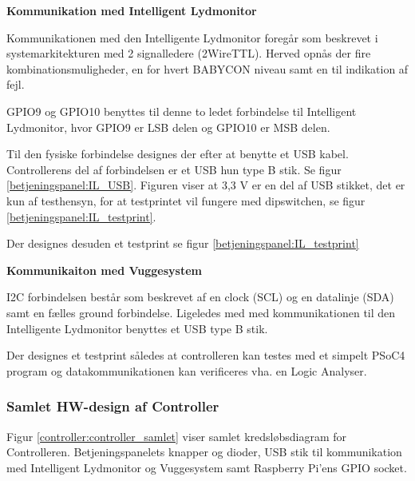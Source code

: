 \textbf{Kommunikation med Intelligent Lydmonitor}

Kommunikationen med den Intelligente Lydmonitor foregår som beskrevet i systemarkitekturen med 2 signalledere (2WireTTL). Herved opnås der fire kombinationsmuligheder, en for hvert BABYCON niveau samt en til indikation  af fejl.

GPIO9 og GPIO10 benyttes til denne to ledet forbindelse til Intelligent Lydmonitor, hvor GPIO9 er LSB delen og GPIO10 er MSB delen. 

Til den fysiske forbindelse designes der efter at benytte et USB kabel. Controllerens del af forbindelsen er et USB hun type B stik. Se figur \ref{betjeningspanel:IL_USB}. Figuren viser at 3,3 V er en del af USB stikket, det er kun af testhensyn, for at testprintet vil fungere med dipswitchen, se figur \ref{betjeningspanel:IL_testprint}.

 
Der designes desuden et testprint se figur  \ref{betjeningspanel:IL_testprint}


\textbf{Kommunikaiton med Vuggesystem}

I2C forbindelsen består som beskrevet af en clock (SCL) og en datalinje (SDA) samt en fælles ground forbindelse. Ligeledes med med kommunikationen til den Intelligente Lydmonitor benyttes et USB type B stik.


Der designes et testprint således at controlleren kan testes med et simpelt PSoC4 program og datakommunikationen kan verificeres vha. en Logic Analyser.


\subsubsection*{Samlet HW-design af Controller}

Figur \ref{controller:controller_samlet} viser samlet kredsløbsdiagram for Controlleren. Betjeningspanelets knapper og dioder, USB stik til kommunikation med Intelligent Lydmonitor og Vuggesystem samt Raspberry Pi'ens GPIO socket.

